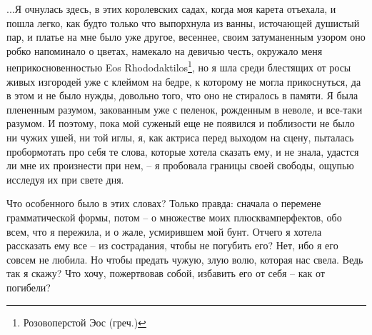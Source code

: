 ...Я очнулась здесь, в этих королевских  садах, когда моя карета отъехала, и
пошла легко, как  будто только что выпорхнула из  ванны, источающей душистый
пар, и  платье на мне было  уже другое, весеннее, своим  затуманенным узором
оно  робко напоминало  о цветах,  намекало на  девичью честь,  окружало меня
неприкосновенностью  Eos Rhododaktilos\footnote{Розовоперстой  Эос (греч.)},
но я шла среди  блестящих от росы живых изгородей уже с  клеймом на бедре, к
которому не  могла прикоснуться, да в  этом и не было  нужды, довольно того,
что оно  не стиралось в памяти.  Я была плененным разумом,  закованным уже с
пеленок, рожденным в неволе, и все-таки разумом. И поэтому, пока мой суженый
еще не  появился и поблизости  не было  ни чужих ушей,  ни той иглы,  я, как
актриса перед  выходом на  сцену, пыталась пробормотать  про себя  те слова,
которые хотела  сказать ему, и  не знала, удастся  ли мне их  произнести при
нем, -- я пробовала границы своей свободы, ощупью исследуя их при свете дня.

Что  особенного  было  в этих словах? Только правда: сначала о перемене
грамматической формы, потом -- о множестве моих плюсквамперфектов, обо всем,
что я пережила, и о жале, усмирившем мой бунт. Отчего  я  хотела  рассказать
ему  все  -- из сострадания, чтобы не погубить его? Нет, ибо я его совсем не
любила. Но чтобы предать чужую, злую волю, которая нас  свела.  Ведь  так  я
скажу? Что хочу, пожертвовав собой, избавить его от себя -- как от погибели?

